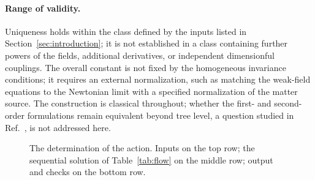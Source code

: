 \documentclass[prd,aps,preprint,nofootinbib,amsmath,amssymb,eqsecnum]{revtex4-2}
\newcommand{\W}{\mathcal{W}}
\begin{document}
\paragraph*{Range of validity.} Uniqueness holds within the class defined by the inputs listed in
Section~\ref{sec:introduction}; it is not established in a class containing further powers of
the fields, additional derivatives, or independent dimensionful couplings. The overall
constant is not fixed by the homogeneous invariance conditions; it requires an external
normalization, such as matching the weak-field equations to the Newtonian limit with a
specified normalization of the matter source. The construction is classical throughout;
whether the first- and second-order formulations remain equivalent beyond tree level, a
question studied in Ref.~\cite{BrandtMcKeon2016}, is not addressed here.

\begin{figure}[htb]
\centering
{}
\caption{The determination of the action. Inputs on the top row; the sequential solution of
Table~\ref{tab:flow} on the middle row; output and checks on the bottom row.}
\label{fig:flow}
\end{figure}
\end{document}
